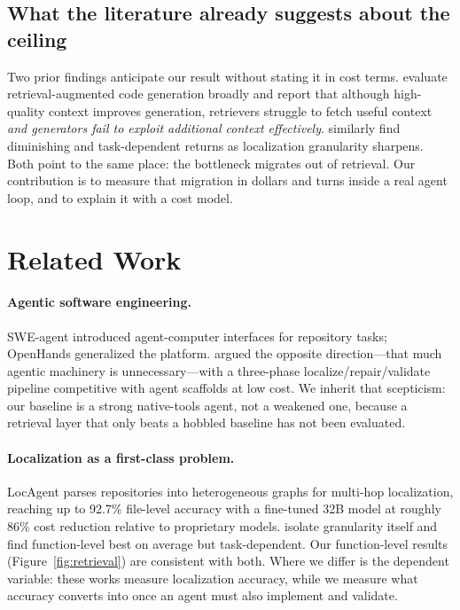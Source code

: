 \documentclass[11pt,letterpaper]{article}
\begin{document}
\subsection{What the literature already suggests about the ceiling}
Two prior findings anticipate our result without stating it in cost terms.
\citet{coderagbench} evaluate retrieval-augmented code generation broadly and
report that although high-quality context improves generation, retrievers
struggle to fetch useful context \emph{and generators fail to exploit additional
context effectively}. \citet{granularity} similarly find diminishing and
task-dependent returns as localization granularity sharpens. Both point to the
same place: the bottleneck migrates out of retrieval. Our contribution is to
measure that migration in dollars and turns inside a real agent loop, and to
explain it with a cost model.

\section{Related Work}

\paragraph{Agentic software engineering.}
SWE-agent \citep{sweagent} introduced agent-computer interfaces for repository
tasks; OpenHands \citep{openhands} generalized the platform.
\citet{agentless} argued the opposite direction---that much agentic
machinery is unnecessary---with a three-phase localize/repair/validate pipeline
competitive with agent scaffolds at low cost. We inherit that scepticism: our
baseline is a strong native-tools agent, not a weakened one, because a retrieval
layer that only beats a hobbled baseline has not been evaluated.

\paragraph{Localization as a first-class problem.}
LocAgent \citep{locagent} parses repositories into heterogeneous graphs for
multi-hop localization, reaching up to 92.7\% file-level accuracy with a
fine-tuned 32B model at roughly 86\% cost reduction relative to proprietary
models. \citet{granularity} isolate granularity itself and find function-level
best on average but task-dependent. Our function-level results
(Figure~\ref{fig:retrieval}) are consistent with both. Where we differ is the
dependent variable: these works measure localization accuracy, while we measure
what accuracy converts into once an agent must also implement and validate.
\end{document}
